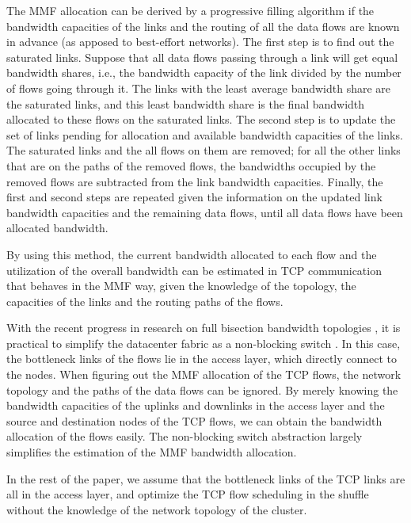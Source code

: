 \documentclass[10pt,journal,compsoc]{IEEEtran}
\begin{document}
The MMF allocation can be derived by a progressive filling
algorithm if the bandwidth capacities of the links and the routing of all the data flows
are known in advance (as apposed to best-effort networks). 
The first step is to find out the saturated links.
Suppose that all data flows passing through a link will get equal
bandwidth shares,
i.e., the bandwidth capacity of the link divided by the number of
flows going through it. 
The links with the least average bandwidth share are the saturated links,
and this least bandwidth share is the final bandwidth allocated to these
flows on the saturated links.
The second step is to update the set of links pending for allocation 
and available bandwidth capacities of the links.
The saturated links and the all flows on them are removed; 
for all the other links that are on the paths of the removed flows, 
the bandwidths occupied by the removed flows are subtracted
from the link bandwidth capacities. 
Finally, the first and second steps are repeated given the information on 
the updated link bandwidth capacities
and the remaining data flows, until all data flows have been allocated
bandwidth.

By using this method, the current bandwidth allocated to
each flow and the utilization of the overall bandwidth can be estimated
in TCP communication that behaves in the MMF way, given
the knowledge of the topology, the capacities of the links and the
routing paths of the flows.

With the recent progress in research on full bisection bandwidth
topologies \cite{greenberg2009vl2, alizadeh2014conga, niranjan2009portland}, 
it is practical to simplify the datacenter fabric as a non-blocking switch \cite{ballani2011towards, chowdhury2011managing, alizadeh2013pfabric, kang2013optimizing, chowdhury2014efficient, chowdhury2015efficient}. 
In this case, the bottleneck links of the flows lie in
the access layer, which directly connect to the nodes.
When figuring out the MMF allocation of the TCP flows,
the network topology and the paths of the data flows
can be ignored. By merely knowing the bandwidth capacities of the
uplinks and downlinks in the access layer
and the source and destination nodes of the TCP flows, we can obtain
the bandwidth allocation of the flows easily. 
The non-blocking switch abstraction largely simplifies the estimation of the MMF bandwidth allocation. 

In the rest of the paper, we assume that the bottleneck links of the
TCP links are all in the access layer,
and optimize the TCP flow scheduling in the shuffle without the
knowledge of the network topology of the cluster.
\end{document}
